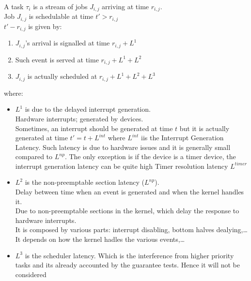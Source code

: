 A task $\tau_i$ is a stream of jobs $J_{i,j}$ arriving at time $r_{i,j}$.\\
Job $J_{i,j}$ is schedulable at time $t' > r_{i,j}$\\
$t' - r_{i,j}$ is given by:
\begin{enumerate}
    \item $J_{i,j}$'s arrival is signalled at time $r_{i,j} + L^1$
    \item Such event is served at time $r_{i,j} + L^1 + L^2$
    \item $J_{i,j}$ is actually scheduled at $r_{i,j} + L^1 + L^2 + L^3$
\end{enumerate}
where:
\begin{itemize}
    \item $L^1$ is due to the delayed interrupt generation.\\
    Hardware interrupts; generated by devices.\\
    Sometimes, an interrupt should be generated at time $t$ but it is actually generated at time $t' = t + L^{int}$ where $L^{int}$ iis the Interrupt Generation Latency.
    Such latency is due to hardware issues and it is generally small compared to $L^{np}$.
    The only exception is if the device is a timer device, the interrupt generation latency can be quite high
    Timer resolution latency $L^{timer}$
    \item $L^2$ is the non-preemptable section latency ($L^{np}$).\\
    Delay between time when an event is generated and when the kernel handles it.\\
    Due to non-preemptable sections in the kernel, which delay the response to hardware interrupts.\\
    It is composed by various parts: interrupt disabling, bottom halves dealying,\dots\\
    It depends on how the kernel hadles the various events,\dots
    \item $L^3$ is the scheduler latency. Which is the interference from higher priority tasks and its already accounted by the guarantee tests. Hence it will not be considered
\end{itemize}


